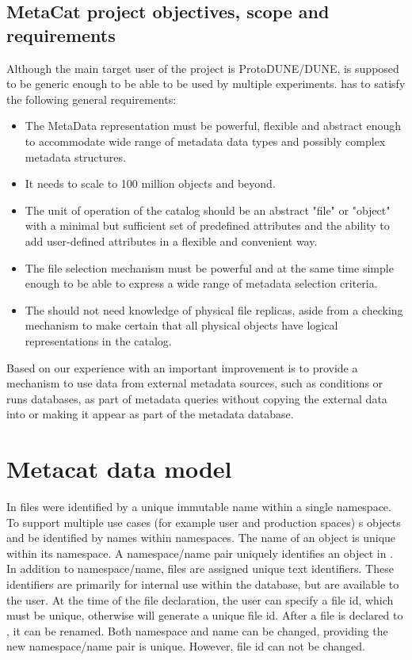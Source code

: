\documentclass[../main-v1.tex]{subfiles}
\begin{document}
\subsection{MetaCat project objectives, scope and requirements}
Although the main target user of the project is ProtoDUNE/DUNE,  is supposed to be generic enough to be able to be used by multiple experiments.    has to satisfy the following general requirements: 

\begin{itemize} 
\item 
The MetaData representation must be powerful, flexible and abstract enough to accommodate wide range of metadata data types and possibly complex metadata structures. 

\item
It needs to scale to 100 million objects and beyond. 

\item
The unit of operation of the catalog should be an abstract "file" or "object" with a  minimal but sufficient set of predefined   attributes and the ability to add user-defined   attributes in a flexible and convenient way. 

\item 
The file selection mechanism must be powerful and at the same time simple enough to be able to express a wide range of metadata selection criteria. 

\item 
The  should not need knowledge of physical file replicas, aside from a checking mechanism to make certain that all physical objects have logical representations in the catalog. 

\end{itemize} 
 

Based on our experience with  an important improvement is to provide a mechanism to use data from external metadata sources, such as conditions or runs databases, as part of metadata queries without copying the external data into or making it appear as part of the metadata database. 

\section{ Metacat data model }
In  files were identified by a unique immutable name within a single namespace.  To support  multiple use cases (for example user and production spaces) s objects and be identified  by names within namespaces. The name of an object is unique within its namespace. A namespace/name pair uniquely identifies  an object in . In addition to namespace/name, files are assigned unique text identifiers. These identifiers are primarily for internal use within the  database, but are available to the user. At the time of the file declaration, the user can specify a file id, which must be unique, otherwise  will generate a unique file id. After a file is declared to , it can be renamed. Both namespace and name can be changed, providing the new namespace/name pair is unique. However, file id can not be changed. 
\end{document}
